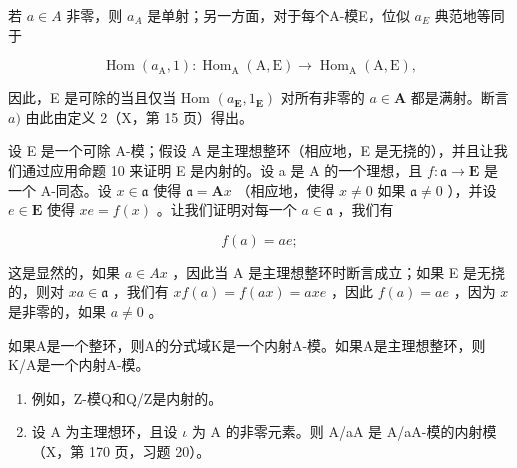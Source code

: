 若 \(a \in A\) 非零，则 \(a_{A}\) 是单射；另一方面，对于每个A-模E，位似 \(a_{E}\) 典范地等同于

\[
\operatorname{Hom} \left(a _ {\mathrm{A}}, 1\right): \operatorname{Hom} _ {\mathrm{A}} (\mathrm{A}, \mathrm{E}) \rightarrow \operatorname{Hom} _ {\mathrm{A}} (\mathrm{A}, \mathrm{E}),
\]

因此，E 是可除的当且仅当 Hom \((a_{\mathbf{E}}, 1_{\mathbf{E}})\) 对所有非零的 \(a \in \mathbf{A}\) 都是满射。断言 \(a)\) 由此由定义 2（X，第 15 页）得出。

设 E 是一个可除 A-模；假设 A 是主理想整环（相应地，E 是无挠的），并且让我们通过应用命题 10 来证明 E 是内射的。设 a 是 A 的一个理想，且 \(f: \mathfrak{a} \to \mathbf{E}\) 是一个 A-同态。设 \(x \in \mathfrak{a}\) 使得 \(\mathfrak{a} = \mathbf{A}x\) （相应地，使得 \(x \neq 0\) 如果 \(\mathfrak{a} \neq 0\) ），并设 \(e \in \mathbf{E}\) 使得 \(xe = f(x)\) 。让我们证明对每一个 \(a \in \mathfrak{a}\) ，我们有

\[
f (a) = a e;
\]

这是显然的，如果 \(a \in Ax\) ，因此当 A 是主理想整环时断言成立；如果 E 是无挠的，则对 \(xa \in \mathfrak{a}\) ，我们有 \(xf(a) = f(ax) = axe\) ，因此 \(f(a) = ae\) ，因为 \(x\) 是非零的，如果 \(a \neq 0\) 。

如果A是一个整环，则A的分式域K是一个内射A-模。如果A是主理想整环，则K/A是一个内射A-模。

\begin{enumerate}
\def\labelenumi{\arabic{enumi})}
\setcounter{enumi}{1}
\item
  例如，Z-模Q和Q/Z是内射的。
\item
  设 A 为主理想环，且设 \(\iota\) 为 A 的非零元素。则 A/aA 是 A/aA-模的内射模（X，第 170 页，习题 20）。
\end{enumerate}

